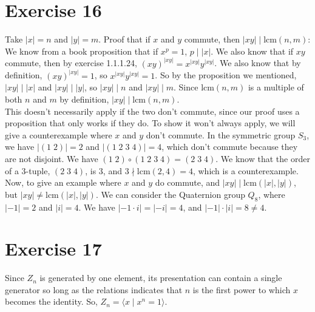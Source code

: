 \documentclass[12pt]{article}
\newcommand{\lcm}{\text{lcm}}
\begin{document}
    \section*{Exercise 16}
    Take $|x| = n$ and $|y| = m$.
    Proof that if $x$ and $y$ commute,
    then $|xy| \mid \lcm(n, m)$: \\
    We know from a book proposition that if $x^p = 1$, $p \mid |x|$.
    We also know that if $xy$ commute,
    then by exercise 1.1.1.24, $(xy)^{|xy|} = x^{|xy|}y^{|xy|}$.
    We also know that by definition, $(xy)^{|xy|} = 1$,
    so $x^{|xy|}y^{|xy|} = 1$.
    So by the proposition we mentioned,
    $|xy| \mid |x|$ and $|xy| \mid |y|$,
    so $|xy| \mid n$ and $|xy| \mid m$.
    Since $\lcm(n, m)$ is a multiple of both $n$ and $m$ by definition,
    $|xy| \mid \lcm(n, m)$. \\
    This doesn't necessarily apply if the two don't commute,
    since our proof uses a proposition that only works if they do.
    To show it won't always apply, we will give a counterexample
    where $x$ and $y$ don't commute.
    In the symmetric group $S_3$,
    we have $|(1\;2)| = 2$ and $|(1\;2\;3\;4)| = 4$,
    which don't commute because they are not disjoint.
    We have $(1\;2) \circ (1\;2\;3\;4) = (2\;3\;4)$.
    We know that the order of a 3-tuple, $(2\;3\;4)$, is 3, 
    and $3 \nmid \lcm(2, 4) = 4$, 
    which is a counterexample. \\
    Now, to give an example where $x$ and $y$ do commute,
    and $|xy| \mid \lcm(|x|, |y|)$, but $|xy| \neq \lcm(|x|, |y|)$.
    We can consider the Quaternion group $Q_8$,
    where $|-1| = 2$ and $|i| = 4$.
    We have $|-1 \cdot i| = |-i| = 4$,
    and $|-1| \cdot |i| = 8 \neq 4$.


    \section*{Exercise 17}
    Since $Z_n$ is generated by one element,
    its presentation can contain a single generator
    so long as the relations indicates that $n$ is the first power
    to which $x$ becomes the identity.
    So, $Z_n = \langle x \mid x^n = 1 \rangle$.
\end{document}
